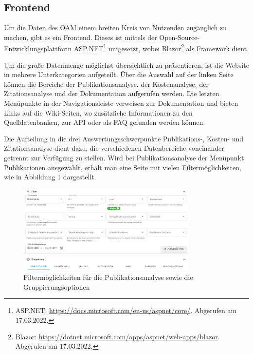 \documentclass[a4paper,
fontsize=11pt,
oneside,
numbers=noperiodatend,
parskip=half-,
bibliography=totoc,
final
]{scrartcl}
\begin{document}
\hypertarget{frontend}{%
\subsection{Frontend}\label{frontend}}

Um die Daten des OAM einem breiten Kreis von Nutzenden zugänglich zu
machen, gibt es ein Frontend. Dieses ist mittels der
Open-Source-Entwicklungsplattform ASP.NET\footnote{ASP.NET:
  \url{https://docs.microsoft.com/en-us/aspnet/core/}. Abgerufen am
  17.03.2022.} umgesetzt, wobei Blazor\footnote{Blazor:
  \url{https://dotnet.microsoft.com/apps/aspnet/web-apps/blazor}.
  Abgerufen am 17.03.2022.} als Framework dient.

Um die große Datenmenge möglichst übersichtlich zu präsentieren, ist die
Website in mehrere Unterkategorien aufgeteilt. Über die Auswahl auf der
linken Seite können die Bereiche der Publikationsanalyse, der
Kostenanalyse, der Zitationsanalyse und der Dokumentation aufgerufen
werden. Die letzten Menüpunkte in der Navigationsleiste verweisen zur
Dokumentation und bieten Links auf die Wiki-Seiten, wo zusätzliche
Informationen zu den Quelldatenbanken, zur API oder als FAQ gefunden
werden können.

Die Aufteilung in die drei Auswertungsschwerpunkte Publikations-,
Kosten- und Zitationsanalyse dient dazu, die verschiedenen Datenbereiche
voneinander getrennt zur Verfügung zu stellen. Wird bei
Publikationsanalyse der Menüpunkt Publikationen ausgewählt, erhält man
eine Seite mit vielen Filtermöglichkeiten, wie in Abbildung 1
dargestellt.

\begin{figure}
\centering
\includegraphics[width=0.8\textwidth]{img/Abb_1_Filter.png}
\caption{Filtermöglichkeiten für die Publikationsanalyse sowie die
Gruppierungsoptionen}
\end{figure}
\end{document}
